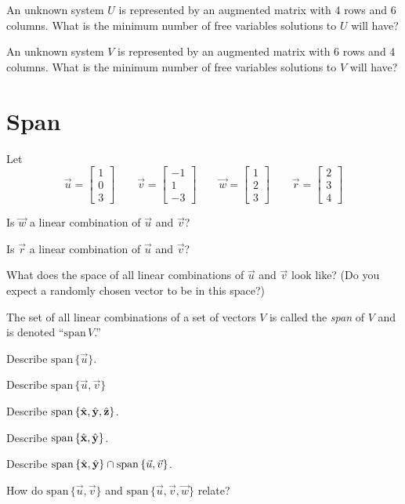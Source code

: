 \documentclass[letter]{article}
\newcommand{\xh}{\hat{\bf x}}
\newcommand{\yh}{\hat{\bf y}}
\newcommand{\zh}{\hat{\bf z}}
\renewcommand{\span}{\mathrm{span}\,}
\newcommand{\mat}[1]{\begin{bmatrix}#1\end{bmatrix}}
\begin{document}
	\begin{Enum}
		\item An unknown system $U$ is represented by an augmented
		matrix with 4 rows and 6 columns.  What is 
		the minimum number of
		free variables solutions to $U$ will have?
		\item An unknown system $V$ is represented by an augmented
		matrix with 6 rows and 4 columns.  What is 
		the minimum number of
		free variables solutions to $V$ will have?
	\end{Enum}

\newpage

\section*{Span}
	Let
	\[
		\vec u=\mat{1\\0\\3} \qquad \vec v=\mat{-1\\1\\-3}
		\qquad \vec w=\mat{1\\2\\3} \qquad \vec r=\mat{2\\3\\4}
	\]

	\begin{Enum}
		\item Is $\vec w$ a linear combination of $\vec u$ and $\vec v$?
		\item Is $\vec r$ a linear combination of $\vec u$ and $\vec v$?
		\item What does the space of all linear combinations of 
		$\vec u$ and $\vec v$ look like? (Do you expect a randomly 
		chosen vector to be in this space?)
	\end{Enum}

	The set of all linear combinations of a set of vectors $V$ is called
	the \emph{span} of $V$ and is denoted ``$\span V$.''
	\begin{Enum}
		\item Describe $\span\{\vec u\}$.
		\item Describe $\span\{\vec u,\vec v\}$
		\item Describe $\span\{\xh,\yh,\zh\}$.
		\item Describe $\span\{\xh,\yh\}$.
		\item Describe $\span\{\xh,\yh\}\cap \span\{\vec u,\vec v\}$.
	\end{Enum}
	\begin{Enum}
		\item How do $\span\{\vec u,\vec v\}$ and
		$\span\{\vec u,\vec v,\vec w\}$ relate?
	\end{Enum}
\end{document}
